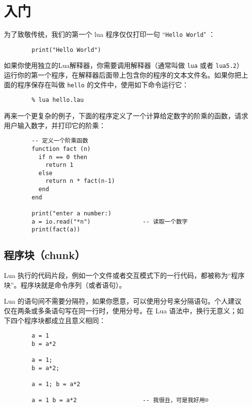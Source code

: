 \chapter{入门}
\setlength{\parindent}{2em}
\small

为了致敬传统，我们的第一个 lua 程序仅仅打印一句 “\verb|Hello World|" ：

\begin{verbatim}
        print("Hello World")
\end{verbatim}

如果你使用独立的Lua解释器，你需要调用解释器（通常叫做 \verb|lua| 或者 \verb|lua5.2|）运行你的第一个程序，在解释器后面带上包含你的程序的文本文件名。如果你把上面的程序保存在叫做 \verb|hello| 的文件中，使用如下命令运行它：

\begin{verbatim}
        % lua hello.lau
\end{verbatim}

再来一个更复杂的例子，下面的程序定义了一个计算给定数字的阶乘的函数，请求用户输入数字，并打印它的阶乘：

\begin{verbatim}
        -- 定义一个阶乘函数
        function fact (n)
          if n == 0 then
            return 1
          else
            return n * fact(n-1)
          end
        end

        print("enter a number:)
        a = io.read("*n")               -- 读取一个数字
        print(fact(a))
\end{verbatim}

\section{程序块（chunk）}

Lua 执行的代码片段，例如一个文件或者交互模式下的一行代码，都被称为“程序块”。程序块就是命令序列（或者语句）。

Lua 的语句间不需要分隔符，如果你愿意，可以使用分号来分隔语句。个人建议仅在两条或多条语句写在同一行时，使用分号。在 Lua 语法中，换行无意义；如下四个程序块都成立且意义相同：

\begin{verbatim}
        a = 1
        b = a*2

        a = 1;
        b = a*2;

        a = 1; b = a*2

        a = 1 b = a*2                   -- 我很丑，可是我好用☺
\end{verbatim}

